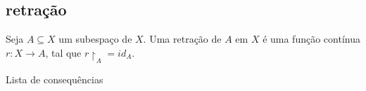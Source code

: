 \subsection{retração}
\label{retração-def}
\begin{defi}[Retração]
Seja $A \subseteq X$ um subespaço de $X$. Uma retração de $A$ em $X$ é uma função contínua $r:X \to A$, tal que $r\restriction_A = id_A$.	 
\end{defi}

\begin{titlemize}{Lista de consequências}
	\item \hyperref[teo-ponto-fixo-brower]{}
\end{titlemize}
